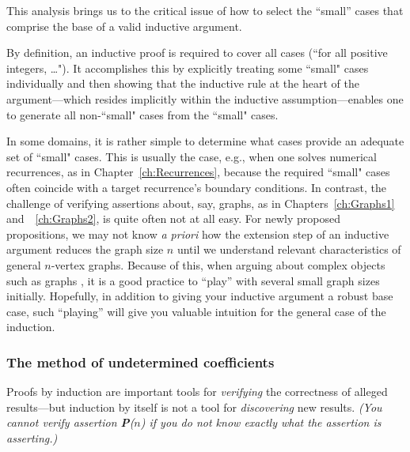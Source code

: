 \smallskip

This analysis brings us to the critical issue of how to select the ``small'' cases that comprise the base of a valid inductive argument.

\medskip

By definition, an inductive proof is required to cover all cases (``for all positive integers, \ldots").  It accomplishes this by explicitly treating some ``small" cases individually and then showing that the inductive rule at the heart of the argument---which resides implicitly within the inductive assumption---enables one to generate all non-``small" cases from the ``small" cases.

In some domains, it is rather simple to determine what cases provide an adequate set of ``small" cases.  This is usually the case, e.g., when one solves numerical recurrences, as in Chapter~\ref{ch:Recurrences}, because the required ``small" cases often coincide with a target recurrence's boundary conditions.  In contrast, the challenge of verifying assertions about, say, graphs, as in Chapters~\ref{ch:Graphs1} and~~\ref{ch:Graphs2}, is quite often not at all easy.  For newly proposed propositions, we may not know {\em a priori} how the extension step of an inductive argument reduces the graph size $n$ until we understand relevant characteristics of general $n$-vertex graphs.  Because of this, when arguing about complex objects such as graphs , it is a good practice to ``play'' with several small graph sizes initially.  Hopefully, in addition to giving your inductive argument a robust base case, such ``playing'' will give you valuable intuition for the general case of the induction.


\subsubsection{The method of undetermined coefficients}
\label{sec:undetermined-coefficients1}


Proofs by induction are important tools for {\em verifying} the correctness of alleged results---but induction by itself is not a tool for {\em discovering} new results.  {\em (You cannot {\em verify} assertion {\bf P}($n$) if you do not know {\em exactly} what the assertion is asserting.)}

\medskip


